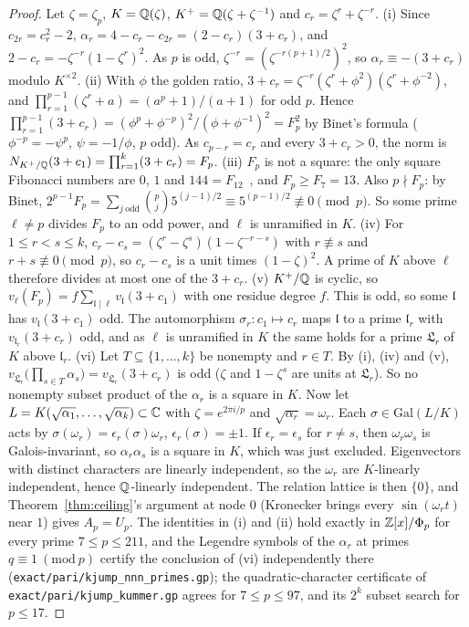 \begin{proof}
Let $\zeta=\zeta_p$, $K=\mathbb{Q}(\zeta)$, $K^+=\mathbb{Q}(\zeta+\zeta^{-1})$ and $c_r=\zeta^r+\zeta^{-r}$.
(i) Since $c_{2r}=c_r^2-2$, $\alpha_r=4-c_r-c_{2r}=(2-c_r)(3+c_r)$, and $2-c_r=-\zeta^{-r}(1-\zeta^r)^2$.
As $p$ is odd, $\zeta^{-r}=(\zeta^{-r(p+1)/2})^2$, so $\alpha_r\equiv-(3+c_r)$ modulo $K^{\times2}$.
(ii) With $\phi$ the golden ratio, $3+c_r=\zeta^{-r}(\zeta^r+\phi^2)(\zeta^r+\phi^{-2})$, and
$\prod_{r=1}^{p-1}(\zeta^r+a)=(a^p+1)/(a+1)$ for odd $p$. Hence
$\prod_{r=1}^{p-1}(3+c_r)=(\phi^p+\phi^{-p})^2/(\phi+\phi^{-1})^2=F_p^2$ by Binet's formula ($\phi^{-p}=-\psi^p$,
$\psi=-1/\phi$, $p$ odd). As $c_{p-r}=c_r$ and every $3+c_r>0$, the norm is
$N_{K^+/\mathbb{Q}}(3+c_1)=\prod_{r=1}^k(3+c_r)=F_p$.
(iii) $F_p$ is not a square: the only square Fibonacci numbers are $0$, $1$ and $144=F_{12}$~\cite{Cohn64},
and $F_p\ge F_7=13$. Also $p\nmid F_p$: by Binet, $2^{p-1}F_p=\sum_{j\ \mathrm{odd}}\binom pj5^{(j-1)/2}\equiv
5^{(p-1)/2}\not\equiv0\pmod p$. So some prime $\ell\ne p$ divides $F_p$ to an odd power, and $\ell$ is
unramified in $K$.
(iv) For $1\le r<s\le k$, $c_r-c_s=(\zeta^r-\zeta^s)(1-\zeta^{-r-s})$ with $r\not\equiv s$ and $r+s\not\equiv0
\pmod p$, so $c_r-c_s$ is a unit times $(1-\zeta)^2$. A prime of $K$ above $\ell$ therefore divides at most one
of the $3+c_r$.
(v) $K^+/\mathbb{Q}$ is cyclic, so $v_\ell(F_p)=f\sum_{\mathfrak l\mid\ell}v_{\mathfrak l}(3+c_1)$ with one residue
degree $f$. This is odd, so some $\mathfrak l$ has $v_{\mathfrak l}(3+c_1)$ odd. The automorphism
$\sigma_r\colon c_1\mapsto c_r$ maps $\mathfrak l$ to a prime $\mathfrak l_r$ with $v_{\mathfrak l_r}(3+c_r)$ odd,
and as $\ell$ is unramified in $K$ the same holds for a prime $\mathfrak L_r$ of $K$ above $\mathfrak l_r$.
(vi) Let $T\subseteq\{1,\dots,k\}$ be nonempty and $r\in T$. By (i), (iv) and (v),
$v_{\mathfrak L_r}\bigl(\prod_{s\in T}\alpha_s\bigr)=v_{\mathfrak L_r}(3+c_r)$ is odd ($\zeta$ and $1-\zeta^s$ are
units at $\mathfrak L_r$). So no nonempty subset product of the $\alpha_r$ is a square in $K$. Now let
$L=K(\sqrt{\alpha_1},\dots,\sqrt{\alpha_k})\subset\mathbb{C}$ with $\zeta=e^{2\pi i/p}$ and $\sqrt{\alpha_r}=\omega_r$.
Each $\sigma\in\mathrm{Gal}(L/K)$ acts by $\sigma(\omega_r)=\epsilon_r(\sigma)\omega_r$, $\epsilon_r(\sigma)=\pm1$.
If $\epsilon_r=\epsilon_s$ for $r\ne s$, then $\omega_r\omega_s$ is Galois-invariant, so $\alpha_r\alpha_s$ is a
square in $K$, which was just excluded. Eigenvectors with distinct characters are linearly independent, so the
$\omega_r$ are $K$-linearly independent, hence $\mathbb{Q}$-linearly independent. The relation lattice is then
$\{0\}$, and Theorem~\ref{thm:ceiling}'s argument at node $0$ (Kronecker brings every $\sin(\omega_rt)$
near $1$) gives $A_p=U_p$. The identities in (i) and (ii) hold exactly in $\mathbb{Z}[x]/\Phi_p$ for every
prime $7\le p\le211$, and the Legendre symbols of the $\alpha_r$ at primes $q\equiv1\ (\mathrm{mod}\ p)$ certify the
conclusion of (vi) independently there (\texttt{exact/pari/kjump\_nnn\_primes.gp}); the quadratic-character
certificate of \texttt{exact/pari/kjump\_kummer.gp} agrees for $7\le p\le97$, and its $2^k$ subset search for $p\le17$.
\end{proof}

